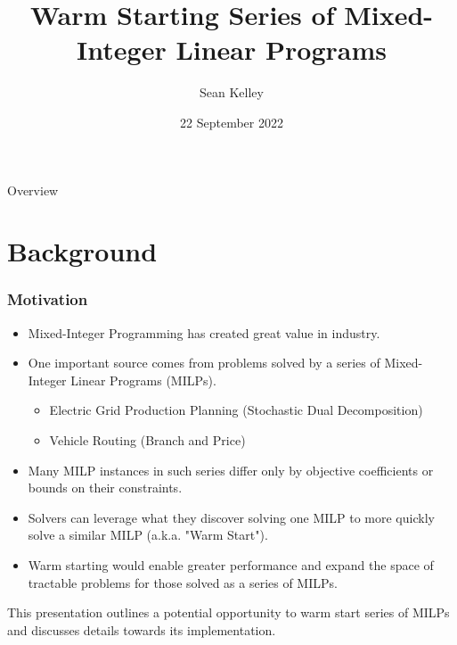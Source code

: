 \documentclass{beamer}
\title[Warm Starting Series of MILP's]{Warm Starting Series of Mixed-Integer Linear Programs}
\author{Sean Kelley} %
\date{22 September 2022} %
\begin{document}
	
	\begin{frame}
		\titlepage %
	\end{frame}

	\begin{frame}{Overview}
		\tableofcontents
	\end{frame}

	\section{Background}
	
	\begin{frame}[t]
		\frametitle{Motivation}
		\small
		\begin{itemize}
			\item Mixed-Integer Programming has created great value in industry.
			\item One important source comes from problems solved by a series of Mixed-Integer Linear Programs (MILPs).
			\begin{itemize}
				\item Electric Grid Production Planning (Stochastic Dual Decomposition)
				\item Vehicle Routing (Branch and Price)
			\end{itemize}
			\item Many MILP instances in such series differ only by objective coefficients or bounds on their constraints.
			\item Solvers can leverage what they discover solving one MILP to more quickly solve a similar MILP (a.k.a. "Warm Start").
			\item Warm starting would enable greater performance and expand the space of tractable problems for those solved as a series of MILPs.
		\end{itemize}
		\vspace{-.25cm}
		\begin{block}{}
			This presentation outlines a potential opportunity to warm start series of MILPs and discusses details towards its implementation.
		\end{block}
		\normalsize
	\end{frame}
\end{document}
